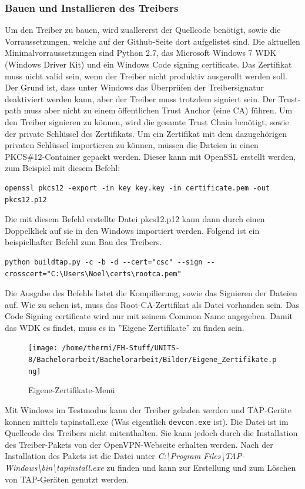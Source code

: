 {\subsubsection{Bauen und Installieren des Treibers}
Um den Treiber zu bauen, wird zuallererst der Quellcode benötigt, sowie die
Vorraussetzungen, welche auf der Github-Seite dort aufgelistet sind.
Die aktuellen Minimalvorraussetzungen sind Python 2.7, das Microsoft Windows 7 WDK (Windows Driver Kit)
und ein Windows Code signing certificate.
Das Zertifikat muss nicht valid sein, wenn der Treiber nicht produktiv ausgerollt
werden soll. Der Grund ist, dass unter Windows das Überprüfen der Treibersignatur deaktiviert
werden kann, aber der Treiber muss trotzdem signiert sein. Der Trust-path muss aber nicht
zu einem öffentlichen Trust Anchor (eine CA) führen. Um den Treiber signieren zu können,
wird die gesamte Trust Chain benötigt, sowie der private Schlüssel des Zertifikats.
Um ein Zertifikat mit dem dazugehörigen privaten Schlüssel importieren zu können,
müssen die Dateien in einen PKCS\#12-Container gepackt werden. Dieser kann mit 
OpenSSL erstellt werden, zum Beispiel mit diesem Befehl:
\begin{lstlisting}[caption=OpenSSL PKCS\#12]
openssl pkcs12 -export -in key key.key -in certificate.pem -out pkcs12.p12
\end{lstlisting}
Die mit diesem Befehl erstellte Datei pkcs12.p12 kann dann durch einen Doppelklick auf sie
in den Windows importiert werden.
Folgend ist ein beispielhafter Befehl zum Bau des Treibers.
\begin{lstlisting}[caption=TAP-Windows bauen]
python buildtap.py -c -b -d --cert="csc" --sign --crosscert="C:\Users\Noel\certs\rootca.pem"
\end{lstlisting}
Die Ausgabe des Befehls listet die Kompilierung, sowie das Signieren der Dateien auf.
Wie zu sehen ist, muss das Root-CA-Zertifikat als Datei vorhanden sein.
Das Code Signing certificate wird nur mit seinem Common Name angegeben.
Damit das WDK es findet, muss es in ''Eigene Zertifikate'' zu finden sein.
\begin{figure}
\texttt{[image: /home/thermi/FH-Stuff/UNITS-8/Bachelorarbeit/Bachelorarbeit/Bilder/Eigene\_Zertifikate.png]}
\caption{Eigene-Zertifikate-Menü}
\label{fig:Eigene-Zertifikate-Menue}
\end{figure}

Mit Windows im Testmodus kann der Treiber geladen werden und TAP-Geräte konnen
mittels tapinstall.exe (Was eigentlich \texttt{devcon.exe} ist). Die Datei ist im Quellcode des
Treibers nicht mitenthalten. Sie kann jedoch durch die Installation des Treiber-Pakets
von der OpenVPN-Webseite erhalten werden. Nach der Installation des Pakets
ist die Datei unter \textit{C:\textbackslash{}Program Files\textbackslash{}TAP-Windows\textbackslash{}bin\textbackslash{}tapinstall.exe}
zu finden und kann zur Erstellung und zum Löschen von TAP-Geräten genutzt werden.

}
